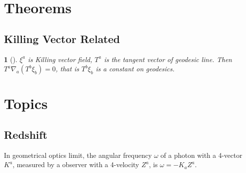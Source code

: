 \section{Theorems}

\subsection{Killing Vector Related}

\newtheorem{theorem}{}[chapter]

\begin{theorem}[]
$\xi^a$ is Killing vector field, $T^a$ is the tangent vector of geodesic line. Then $T^a\nabla_a(T^b\xi_b)=0$, that is $T^b\xi_b$ is a constant on geodesics.
\end{theorem}




\section{Topics}
\subsection{Redshift}

In geometrical optics limit, the angular frequency $\omega$ of a photon with a 4-vector $K^a$, measured by a observer with a 4-velocity $Z^a$, is $\omega=-K_aZ^a$.

